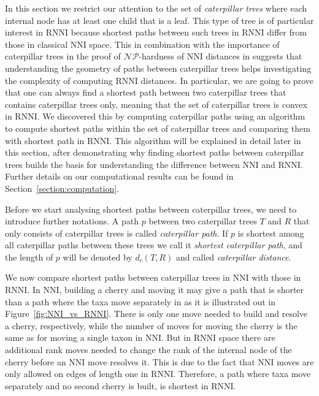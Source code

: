 \documentclass{amsart}
\newcommand{\np}{\mathcal{NP}}
\newcommand{\nni}{\mathrm{NNI}}
\newcommand{\rnni}{\mathrm{RNNI}}
\begin{document}
In this section we restrict our attention to the set of \emph{caterpillar trees} where each internal node has at least one child that is a leaf.
This type of tree is of particular interest in $\rnni$ because shortest paths between such trees in $\rnni$ differ from those in classical $\nni$ space.
This in combination with the importance of caterpillar trees in the proof of $\np$-hardness of $\nni$ distances in \autocite{Dasgupta2000-xa} suggests that understanding the geometry of paths between caterpillar trees helps investigating the complexity of computing $\rnni$ distances.
In particular, we are going to prove that one can always find a shortest path between two caterpillar trees that contains caterpillar trees only, meaning that the set of caterpillar trees is convex in $\rnni$.
We discovered this by computing caterpillar paths using an algorithm to compute shortest paths within the set of caterpillar trees and comparing them with shortest path in $\rnni$.
This algorithm will be explained in detail later in this section, after demonstrating why finding shortest paths between caterpillar trees builds the basis for understanding the difference between $\nni$ and $\rnni$.
Further details on our computational results can be found in Section~\ref{section:computation}.

Before we start analysing shortest paths between caterpillar trees, we need to introduce further notations.
A path $p$ between two caterpillar trees $T$ and $R$ that only consists of caterpillar trees is called \emph{caterpillar path}.
If $p$ is shortest among all caterpillar paths between these trees we call it \emph{shortest caterpillar path}, and the length of $p$ will be denoted by $d_c(T,R)$ and called \emph{caterpillar distance}.

We now compare shortest paths between caterpillar trees in $\nni$ with those in $\rnni$.
In $\nni$, building a cherry and moving it may give a path that is shorter than a path where the taxa move separately in as it is illustrated out in Figure~\ref{fig:NNI_vs_RNNI}.
There is only one move needed to build and resolve a cherry, respectively, while the number of moves for moving the cherry is the same as for moving a single taxon in $\nni$.
But in $\rnni$ space there are additional rank moves needed to change the rank of the internal node of the cherry before an $\nni$ move resolves it.
This is due to the fact that $\nni$ moves are only allowed on edges of length one in $\rnni$.
Therefore, a path where taxa move separately and no second cherry is built, is shortest in $\rnni$.
\end{document}
